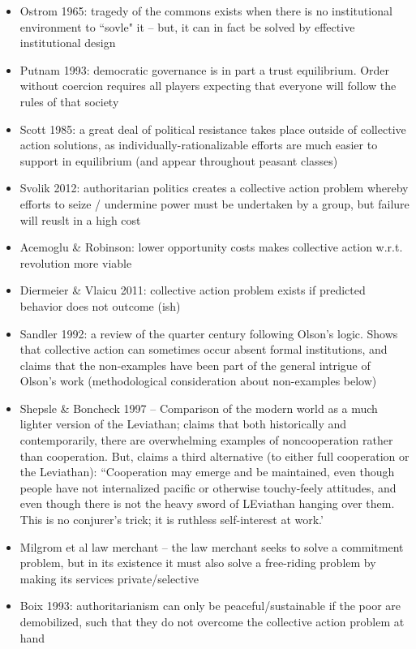 \documentclass[12pt]{article}
\begin{document}
\begin{itemize}
    \begin{itemize}
        \item Also note -- ``exploitation of the great by the small'' -- largest stakeholders tend to contribute disproportionately as they have the most to lose by nonappropriation
    \end{itemize}
    \item Ostrom 1965: tragedy of the commons exists when there is no institutional environment to ``sovle" it -- but, it can in fact be solved by effective institutional design
    \item Putnam 1993: democratic governance is in part a trust equilibrium. Order without coercion requires all players expecting that everyone will follow the rules of that society
    \item Scott 1985: a great deal of political resistance takes place outside of collective action solutions, as individually-rationalizable efforts are much easier to support in equilibrium (and appear throughout peasant classes)
    \item Svolik 2012: authoritarian politics creates a collective action problem whereby efforts to seize / undermine power must be undertaken by a group, but failure will reuslt in a high cost
    \item Acemoglu \& Robinson: lower opportunity costs makes collective action w.r.t. revolution more viable
    \item Diermeier \& Vlaicu 2011: collective action problem exists if predicted behavior does not outcome (ish)
    \item Sandler 1992: a review of the quarter century following Olson's logic. Shows that collective action can sometimes occur absent formal institutions, and claims that the non-examples have been part of the general intrigue of Olson's work (methodological consideration about non-examples below)
    \item Shepsle \& Boncheck 1997 -- Comparison of the modern world as a much lighter version of the Leviathan; claims that both historically and contemporarily, there are overwhelming examples of noncooperation rather than cooperation. But, claims a third alternative (to either full cooperation or the Leviathan): ``Cooperation may emerge and be maintained, even though people have not internalized pacific or otherwise touchy-feely attitudes, and even though there is not the heavy sword of LEviathan hanging over them. This is no conjurer's trick; it is ruthless self-interest at work.'
    \item Milgrom et al law merchant -- the law merchant seeks to solve a commitment problem, but in its existence it must also solve a free-riding problem by making its services private/selective
    \item Boix 1993: authoritarianism can only be peaceful/sustainable if the poor are demobilized, such that they do not overcome the collective action problem at hand
\end{itemize}
\end{document}
